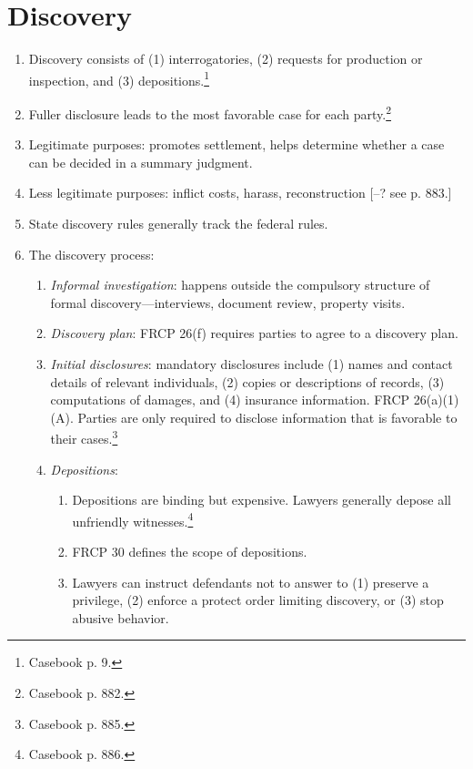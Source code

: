 \section{Discovery}

\begin{enumerate}
    \item Discovery consists of (1) interrogatories, (2) requests for 
    production or inspection, and (3) depositions.\footnote{Casebook p. 9.}
    \item Fuller disclosure leads to the most favorable case for each 
    party.\footnote{Casebook p. 882.}
    \item Legitimate purposes: promotes settlement, helps determine whether a 
    case can be decided in a summary judgment.
    \item Less legitimate purposes: inflict costs, harass, reconstruction [--? 
    see p. 883.]
    \item State discovery rules generally track the federal rules.
    \item The discovery process:
    \begin{enumerate}
        \item \emph{Informal investigation}: happens outside the compulsory 
        structure of formal discovery---interviews, document review, property 
        visits.
        \item \emph{Discovery plan}: FRCP 26(f) requires parties to agree to a 
        discovery plan.
        \item \emph{Initial disclosures}: mandatory disclosures include (1) 
        names and contact details of relevant individuals, (2) copies or 
        descriptions of records, (3) computations of damages, and (4) 
        insurance information. FRCP 26(a)(1)(A). Parties are only required to 
        disclose information that is favorable to their 
        cases.\footnote{Casebook p. 885.}
        \item \emph{Depositions}:
        \begin{enumerate}
            \item Depositions are binding but expensive. Lawyers generally 
            depose all unfriendly witnesses.\footnote{Casebook p. 886.}
            \item FRCP 30 defines the scope of depositions.
            \item Lawyers can instruct defendants not to answer to (1) 
            preserve a privilege, (2) enforce a protect order limiting 
            discovery, or (3) stop abusive behavior.

\end{enumerate}
\end{enumerate}
\end{enumerate}
